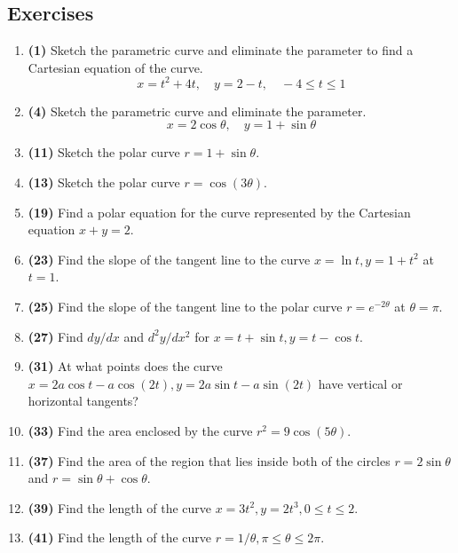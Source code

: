 \documentclass[12pt, a4paper]{article}
\begin{document}
\subsection*{Exercises}
\begin{enumerate}
    \item \textbf{(1)} Sketch the parametric curve and eliminate the parameter to find a Cartesian equation of the curve.
    \[ x = t^2 + 4t, \quad y = 2 - t, \quad -4 \le t \le 1 \]

    \item \textbf{(4)} Sketch the parametric curve and eliminate the parameter.
    \[ x = 2\cos\theta, \quad y = 1 + \sin\theta \]
    
    \item \textbf{(11)} Sketch the polar curve $r = 1 + \sin\theta$.

    \item \textbf{(13)} Sketch the polar curve $r = \cos(3\theta)$.

    \item \textbf{(19)} Find a polar equation for the curve represented by the Cartesian equation $x+y=2$.
    
    \item \textbf{(23)} Find the slope of the tangent line to the curve $x = \ln t, y = 1 + t^2$ at $t = 1$.

    \item \textbf{(25)} Find the slope of the tangent line to the polar curve $r = e^{-2\theta}$ at $\theta = \pi$.
    
    \item \textbf{(27)} Find $dy/dx$ and $d^2y/dx^2$ for $x = t + \sin t, y = t - \cos t$.

    \item \textbf{(31)} At what points does the curve $x = 2a\cos t - a\cos(2t), y = 2a\sin t - a\sin(2t)$ have vertical or horizontal tangents?

    \item \textbf{(33)} Find the area enclosed by the curve $r^2 = 9\cos(5\theta)$.
    
    \item \textbf{(37)} Find the area of the region that lies inside both of the circles $r = 2\sin\theta$ and $r = \sin\theta + \cos\theta$.

    \item \textbf{(39)} Find the length of the curve $x = 3t^2, y = 2t^3, 0 \le t \le 2$.

    \item \textbf{(41)} Find the length of the curve $r = 1/\theta, \pi \le \theta \le 2\pi$.


\end{enumerate}
\end{document}
